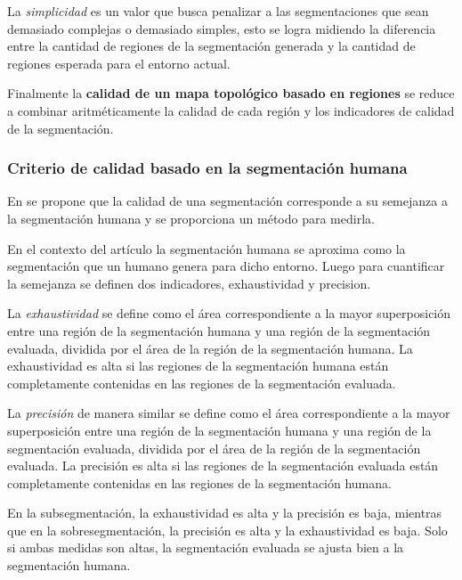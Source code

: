 
La \emph{simplicidad} es un valor que busca penalizar a las segmentaciones que
sean demasiado complejas o demasiado simples, esto se logra midiendo la
diferencia entre la cantidad de regiones de la segmentación generada y la 
cantidad de regiones esperada para el entorno actual.

Finalmente la \textbf{calidad de un mapa topológico basado en regiones} se
reduce a combinar aritméticamente la calidad de cada región y los indicadores
de calidad de la segmentación.


\subsubsection{Criterio de calidad basado en la segmentación humana}
En \cite{bormann2016room} se propone que la calidad de una segmentación
corresponde a su semejanza a la segmentación humana y se proporciona un método
para medirla.  

En el contexto del artículo la segmentación humana se aproxima como la
segmentación que un humano genera para dicho entorno. Luego para cuantificar la
semejanza se definen dos indicadores, exhaustividad y precision. 

La \emph{exhaustividad} se define como el área correspondiente a la mayor 
superposición entre una región de la segmentación humana y una región de la
segmentación evaluada, dividida por el área de la región de la segmentación
humana. La exhaustividad es alta si las regiones de la segmentación humana
están completamente contenidas en las regiones de la segmentación evaluada. 

La \emph{precisión} de manera similar se define como el área correspondiente a
la mayor superposición entre una región de la segmentación humana y una región
de la segmentación evaluada, dividida por el área de la región de la
segmentación evaluada. La precisión es alta si las regiones de la segmentación
evaluada están completamente contenidas en las regiones de la segmentación
humana. 

En la subsegmentación, la exhaustividad es alta y la precisión es baja,
mientras que en la sobresegmentación, la precisión es alta y la exhaustividad
es baja.  Solo si ambas medidas son altas, la segmentación evaluada se ajusta
bien a la segmentación humana.  

